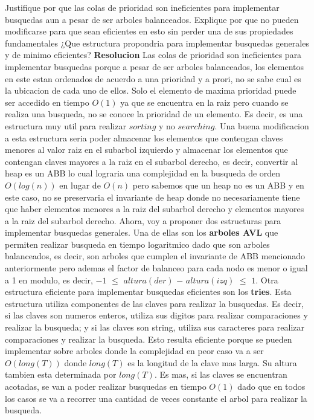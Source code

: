 \documentclass[10pt,a4paper]{article}
\begin{document}
Justifique por que las colas de prioridad son ineficientes para implementar busquedas aun a pesar de ser arboles balanceados. Explique por que no pueden modificarse para que sean eficientes en esto sin perder una de sus propiedades fundamentales ¿Que estructura propondria para implementar busquedas generales y de minimo eficientes?
\newline
\newline
\textbf{Resolucion}
\newline
\newline
Las colas de prioridad son ineficientes para implementar busquedas porque a pesar de ser arboles balanceados, los elementos en este estan ordenados de acuerdo a una prioridad y a prori, no se sabe cual es la ubicacion de cada uno de ellos. Solo el elemento de maxima prioridad puede ser accedido en tiempo $O(1)$ ya que se encuentra en la raiz pero cuando se realiza una busqueda, no se conoce la prioridad de un elemento. Es decir, es una estructura muy util para realizar $sorting$ y no $searching$. 
\newline
\newline
Una buena modificacion a esta estructura seria poder almacenar los elementos que contengan claves menores al valor raiz en el subarbol izquierdo y almacenar los elementos que contengan claves mayores a la raiz en el subarbol derecho, es decir, convertir al heap es un ABB lo cual lograria una complejidad en la busqueda de orden $O(log(n))$ en lugar de $O(n)$ pero sabemos que un heap no es un ABB y en este caso, no se preservaria el invariante de heap donde no necesariamente tiene que haber elementos menores a la raiz del subarbol derecho y elementos mayores a la raiz del subarbol derecho.
\newline
\newline
Ahora, voy a proponer dos estructuras para implementar busquedas generales. Una de ellas son los \textbf{arboles AVL} que permiten realizar busqueda en tiempo logaritmico dado que son arboles balanceados, es decir, son arboles que cumplen el invariante de ABB mencionado anteriormente pero ademas el factor de balanceo para cada nodo es menor o igual a 1 en modulo, es decir, $-1$ $\leq$ $altura(der)$ $-$ $altura(izq)$ $\leq$ $1$. Otra estructura eficiente para implementar busquedas eficientes son los \textbf{tries}. Esta estructura utiliza componentes de las claves para realizar la busquedas. Es decir, si las claves son numeros enteros, utiliza sus digitos para realizar comparaciones y realizar la busqueda; y si las claves son string, utiliza sus caracteres para realizar comparaciones y realizar la busqueda. Esto resulta eficiente porque se pueden implementar sobre arboles donde la complejidad en peor caso va a ser $O(long(T))$ donde $long(T)$ es la longitud de la clave mas larga. Su altura tambien esta determinada por $long(T)$. Es mas, si las claves se encuentran acotadas, se van a poder realizar busquedas en tiempo $O(1)$ dado que en todos los casos se va a recorrer una cantidad de veces constante el arbol para realizar la busqueda. 
\end{document}
